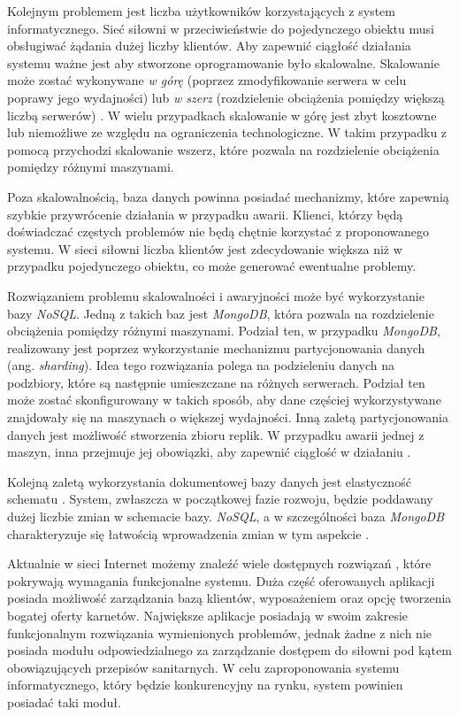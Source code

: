 \documentclass[a4paper,twoside,12pt]{book}
\newcommand{\obcy}[1]{\emph{#1}}
\newcommand{\ang}[1]{{\selectlanguage{british}\obcy{#1}}}
\begin{document}
{Kolejnym problemem jest liczba użytkowników korzystających z system informatycznego. Sieć siłowni w przeciwieństwie do pojedynczego obiektu musi obsługiwać żądania dużej liczby klientów. Aby zapewnić ciągłość działania systemu ważne jest aby stworzone oprogramowanie było skalowalne. Skalowanie może zostać wykonywane \textit{w górę} (poprzez zmodyfikowanie serwera w celu poprawy jego wydajności) lub \textit{w szerz} (rozdzielenie obciążenia pomiędzy większą liczbą serwerów) \cite{bib:mongodb_guide}. W wielu przypadkach skalowanie w górę jest zbyt kosztowne lub niemożliwe ze względu na ograniczenia technologiczne. W takim przypadku z pomocą przychodzi skalowanie wszerz, które pozwala na rozdzielenie obciążenia pomiędzy różnymi maszynami.

Poza skalowalnością, baza danych powinna posiadać mechanizmy, które zapewnią szybkie przywrócenie działania w przypadku awarii. Klienci, którzy będą doświadczać częstych problemów nie będą chętnie korzystać z proponowanego systemu. W sieci siłowni liczba klientów jest zdecydowanie większa niż w przypadku pojedynczego obiektu, co może generować ewentualne problemy.

Rozwiązaniem problemu skalowalności i awaryjności może być wykorzystanie bazy \textit{NoSQL}. Jedną z takich baz jest \textit{MongoDB}, która pozwala na rozdzielenie obciążenia pomiędzy różnymi maszynami. Podział ten, w przypadku \textit{MongoDB}, realizowany jest poprzez wykorzystanie mechanizmu partycjonowania danych (ang. \ang{sharding}). Idea tego rozwiązania polega na podzieleniu danych na podzbiory, które są następnie umieszczane na różnych serwerach. Podział ten może zostać skonfigurowany w takich sposób, aby dane częściej wykorzystywane znajdowały się na maszynach o większej wydajności. Inną zaletą partycjonowania danych jest możliwość stworzenia zbioru replik. W przypadku awarii jednej z maszyn, inna przejmuje jej obowiązki, aby zapewnić ciągłość w działaniu \cite{bib:mongodb_guide}.

Kolejną zaletą wykorzystania dokumentowej bazy danych jest elastyczność schematu \cite{bib:noSqlVsSql}. System, zwłaszcza w początkowej fazie rozwoju, będzie poddawany dużej liczbie zmian w schemacie bazy. \textit{NoSQL}, a w szczególności baza \textit{MongoDB} charakteryzuje się łatwością wprowadzenia zmian w tym aspekcie \cite{bib:mongoPros}.

Aktualnie w sieci Internet możemy znaleźć wiele dostępnych rozwiązań \cite{bib:perfectgym} \cite{bib:wodguru}, które pokrywają wymagania funkcjonalne systemu. Duża część oferowanych aplikacji posiada możliwość zarządzania bazą klientów, wyposażeniem oraz opcję tworzenia bogatej oferty karnetów. Największe aplikacje posiadają w swoim zakresie funkcjonalnym rozwiązania wymienionych problemów, jednak żadne z nich nie posiada modułu odpowiedzialnego za zarządzanie dostępem do siłowni pod kątem obowiązujących przepisów sanitarnych. W celu zaproponowania systemu informatycznego, który będzie konkurencyjny na rynku, system powinien posiadać taki moduł.

}
\end{document}
